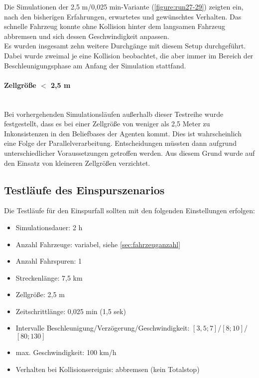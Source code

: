Die Simulationen der 2,5 m/0,025 min-Variante (\cref{figure:run27-29}) zeigten ein, nach den bisherigen Erfahrungen, erwartetes und gewünschtes Verhalten.
Das schnelle Fahrzeug konnte ohne Kollision hinter dem langsamen Fahrzeug abbremsen und sich dessen Geschwindigkeit anpassen.
\\
Es wurden insgesamt zehn weitere Durchgänge mit diesem Setup durchgeführt. 
Dabei wurde zweimal je eine Kollision beobachtet, die aber immer im Bereich der Beschleunigungsphase am Anfang der Simulation stattfand. 


\paragraph*{\texorpdfstring{Zellgröße $ < $ 2,5 m}%
                              {Zellgröße kleiner als 2,5 m}}
\hfill \\
Bei vorhergehenden Simulationsläufen außerhalb dieser Testreihe wurde festgestellt, dass es bei einer Zellgröße von weniger als 2,5 Meter zu Inkonsistenzen in den Beliefbases der Agenten kommt.
Dies ist wahrscheinlich eine Folge der Parallelverarbeitung.
Entscheidungen müssten dann aufgrund unterschiedlicher Voraussetzungen getroffen werden.
Aus diesem Grund wurde auf den Einsatz von kleineren Zellgrößen verzichtet.






\subsection{Testläufe des Einspurszenarios}
\label{sec:test-singlelane}

Die Testläufe für den Einspurfall sollten mit den folgenden Einstellungen erfolgen:
\begin{itemize}
	\itemsep0em
	\item Simulationsdauer: 2 h
	\item Anzahl Fahrzeuge: variabel, siehe \cref{sec:fahrzeuganzahl}
	\item Anzahl Fahrspuren: 1
	\item Streckenlänge: 7,5 km 
	\item Zellgröße: 2,5 m
	\item Zeitschrittlänge: 0,025 min (1,5 sek)
	\item Intervalle Beschleunigung/Verzögerung/Geschwindigkeit: $ [3,5; 7] $/$ [8; 10] $/$ [80; 130] $
	\item max. Geschwindigkeit: 100 km/h
	\item Verhalten bei Kollisionsereignis: abbremsen (kein Totalstop)
\end{itemize}


